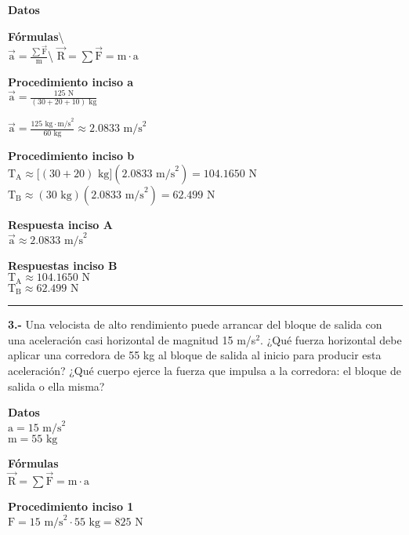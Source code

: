 \documentclass[
]{article}
\begin{document}
\textbf{Datos}

\textbf{Fórmulas}\textbackslash{}\\
{\(\overset{\rightarrow}{\text{a}} = \frac{\sum\overset{\rightarrow}{\text{F}}}{\text{m}}\)}\textbackslash{}
{\(\overset{\rightarrow}{\text{R}} = \sum\overset{\rightarrow}{\text{F}} = \text{m} \cdot \text{a}\)}

\textbf{Procedimiento inciso a}\\
{\(\overset{\rightarrow}{\text{a}} = \frac{125\text{~N}}{(30 + 20 + 10)\text{~kg}}\)}

{\(\overset{\rightarrow}{\text{a}} = \frac{125\text{~kg} \cdot \text{m/s}^{2}}{60\text{~kg}} \approx 2.0833\text{~m/s}^{2}\)}

\textbf{Procedimiento inciso b}\\
{\(\text{T}_{\text{A}} \approx \lbrack(30 + 20)\text{~kg}\rbrack(2.0833\text{~m/s}^{2}) = 104.1650\text{~N}\)}\\
{\(\text{T}_{\text{B}} \approx (30\text{~kg})(2.0833\text{~m/s}^{2}) = 62.499\text{~N}\)}

\textbf{Respuesta inciso A}\\
{\(\overset{\rightarrow}{\text{a}} \approx 2.0833\text{~m/s}^{2}\)}

\textbf{Respuestas inciso B}\\
{\(\text{T}_{\text{A}} \approx 104.1650\text{~N}\)}\\
{\(\text{T}_{\text{B}} \approx 62.499\text{~N}\)}

\begin{center}\rule{0.5\linewidth}{0.5pt}\end{center}

\textbf{3.-} Una velocista de alto rendimiento puede arrancar del bloque
de salida con una aceleración casi horizontal de magnitud 15
m/s{\(^{2}\)}. ¿Qué fuerza horizontal debe aplicar una corredora de 55
kg al bloque de salida al inicio para producir esta aceleración? ¿Qué
cuerpo ejerce la fuerza que impulsa a la corredora: el bloque de salida
o ella misma?

\textbf{Datos}\\
{\(\text{a} = 15\text{~m/s}^{2}\)}\\
{\(\text{m} = 55\text{~kg}\)}

\textbf{Fórmulas}\\
{\(\overset{\rightarrow}{\text{R}} = \sum\overset{\rightarrow}{\text{F}} = \text{m} \cdot \text{a}\)}

\textbf{Procedimiento inciso 1}\\
{\(\text{F} = 15\text{~m/s}^{2} \cdot 55\text{~kg} = 825\text{~N}\)}
\end{document}
